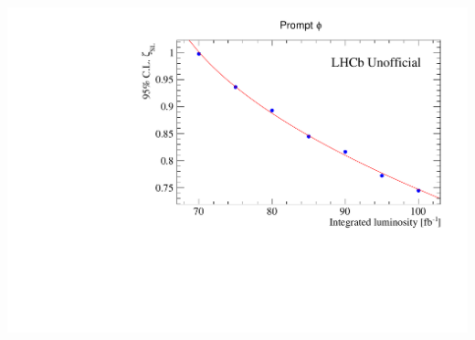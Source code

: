\begin{center}
\includegraphics[width=.7\textwidth,trim= 0mm 0mm 0mm 10mm, clip]{figs/limits.pdf}
 \label{FIG:Limits}
\end{center}



